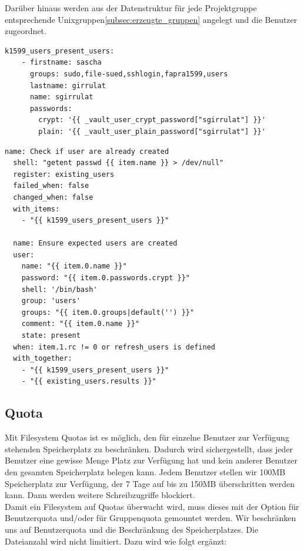 Darüber hinaus werden aus der Datenstruktur  für jede Projektgruppe entsprechende Unixgruppen\ref{subsec:erzeugte_gruppen} angelegt und die Benutzer zugeordnet.

\begin{lstlisting}[label=code:syslog3,caption=Auszug aus ansible/group\_vars/file\_server/public]
  k1599_users_present_users:
    - firstname: sascha
      groups: sudo,file-sued,sshlogin,fapra1599,users
      lastname: girrulat
      name: sgirrulat
      passwords:
        crypt: '{{ _vault_user_crypt_password["sgirrulat"] }}'
        plain: '{{ _vault_user_plain_password["sgirrulat"] }}'
\end{lstlisting}

\begin{lstlisting}[label=code:syslog3,caption=Auszug aus der Datei ansible/roles/k1599\_users/tasks/main.yml]
  name: Check if user are already created
  shell: "getent passwd {{ item.name }} > /dev/null"
  register: existing_users
  failed_when: false
  changed_when: false
  with_items:
    - "{{ k1599_users_present_users }}"

  name: Ensure expected users are created
  user:
    name: "{{ item.0.name }}"
    password: "{{ item.0.passwords.crypt }}"
    shell: '/bin/bash'
    group: 'users'
    groups: "{{ item.0.groups|default('') }}"
    comment: "{{ item.0.name }}"
    state: present
  when: item.1.rc != 0 or refresh_users is defined
  with_together:
    - "{{ k1599_users_present_users }}"
    - "{{ existing_users.results }}"
\end{lstlisting}

\subsection{Quota}
Mit Filesystem Quotas ist es möglich, den für einzelne Benutzer zur Verfügung
stehenden Speicherplatz zu beschränken. Dadurch wird sichergestellt, dass jeder
Benutzer eine gewisse Menge Platz zur Verfügung hat und kein anderer Benutzer
den gesamten Speicherplatz belegen kann. Jedem Benutzer stellen wir 100MB
Speicherplatz zur Verfügung, der 7 Tage auf bis zu 150MB überschritten werden
kann. Dann werden weitere Schreibzugriffe blockiert.\\

Damit ein Filesystem auf Quotas überwacht wird, muss dieses mit der Option
 für Benutzerquota und/oder  für Gruppenquota
gemountet werden. Wir beschränken uns auf Benutzerquota und die Beschränkung
des Speicherplatzes. Die Dateianzahl wird nicht limitiert. Dazu wird
 wie folgt ergänzt:\\

